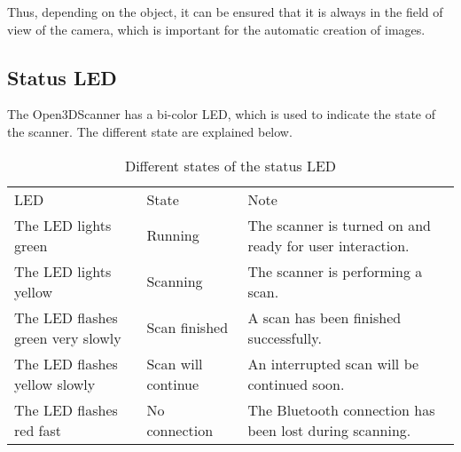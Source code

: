 Thus, depending on the object, it can be ensured that it is always in the field of view of the camera, which is important for the automatic creation of images.%

\subsection{Status LED}%
The Open3DScanner has a bi-color LED, which is used to indicate the state of the scanner. The different state are explained below.%

\begin{table}[ht!]%
	\begin{centered}%
		\begin{tabularx} {\linewidth} {>{\rowmac \hsize=1\hsize}X>{\rowmac \hsize=1\hsize}X>{\rowmac \hsize=1\hsize}X<{\clearrow}}%
			\tabularxHeader%
			LED & State & Note\\%
			The LED lights green & Running & The scanner is turned on and ready for user interaction.\\%
			The LED lights yellow & Scanning & The scanner is performing a scan.\\%
			The LED flashes green very slowly & Scan finished & A scan has been finished successfully.\\%
			The LED flashes yellow slowly & Scan will continue & An interrupted scan will be continued soon.\\%
			The LED flashes red fast & No connection & The Bluetooth connection has been lost during scanning.\\%
		\end{tabularx}%
		\caption{Different states of the status LED}%
	\end{centered}%
\end{table}%